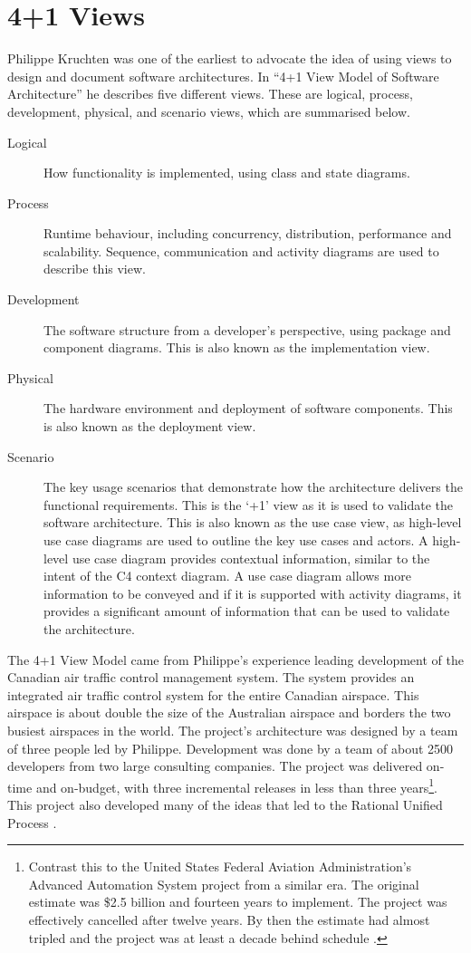 \section{4+1 Views}
Philippe Kruchten was one of the earliest to advocate the idea of using views to design and document software architectures.
In ``4+1 View Model of Software Architecture'' \cite{4+1-model} he describes five different views.
These are logical, process, development, physical, and scenario views, which are summarised below.
\begin{description}
    \item[Logical] How functionality is implemented, using class and state diagrams.
    \item[Process] Runtime behaviour, including concurrency, distribution, performance and scalability.
                            Sequence, communication and activity diagrams are used to describe this view.
    \item[Development] The software structure from a developer's perspective, using package and component diagrams.
                                    This is also known as the implementation view.
    \item[Physical] The hardware environment and deployment of software components.
                            This is also known as the deployment view.
    \item[Scenario] The key usage scenarios that demonstrate how the architecture delivers the functional requirements.
                             This is the `+1' view as it is used to validate the software architecture.
                             This is also known as the use case view, as high-level use case diagrams are used to outline the key use cases and actors.
							 A high-level use case diagram provides contextual information, similar to the intent of the C4 context diagram.
							 A use case diagram allows more information to be conveyed and if it is supported with activity diagrams,
							 it provides a significant amount of information that can be used to validate the architecture.
\end{description}
The 4+1 View Model came from Philippe's experience leading development of the Canadian air traffic control management system.
The system provides an integrated air traffic control system for the entire Canadian airspace.
This airspace is about double the size of the Australian airspace and borders the two busiest airspaces in the world.
The project's architecture was designed by a team of three people led by Philippe.
Development was done by a team of about 2500 developers from two large consulting companies.
The project was delivered on-time and on-budget, with three incremental releases in less than three years\footnote{Contrast
this to the United States Federal Aviation Administration's Advanced Automation System project from a similar era.
The original estimate was \$2.5 billion and fourteen years to implement.
The project was effectively cancelled after twelve years.
By then the estimate had almost tripled and the project was at least a decade behind schedule \cite{faa-aas}.}.
This project also developed many of the ideas that led to the Rational Unified Process \cite{kruchten2004rational}.


